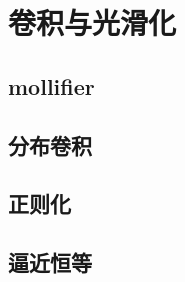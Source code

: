 \section{卷积与光滑化}
\label{b1:sec:2003}


\subsection{mollifier}
\label{b1:subsec:200301}

\subsection{分布卷积}
\label{b1:subsec:200302}

\subsection{正则化}
\label{b1:subsec:200303}

\subsection{逼近恒等}
\label{b1:subsec:200304}


